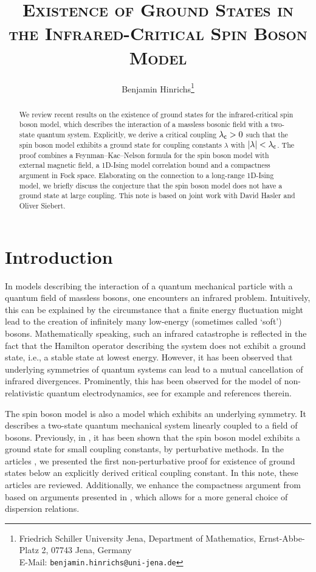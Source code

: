 \documentclass[a4paper,12pt,oneside]{article}
\title{\LARGE\scshape   Existence of Ground States in the Infrared-Critical Spin Boson Model}
\author{Benjamin Hinrichs\thanks{Friedrich Schiller University Jena, Department of Mathematics, Ernst-Abbe-Platz 2, 07743 Jena, Germany\\E-Mail: \texttt{benjamin.hinrichs@uni-jena.de}}}
\begin{document}
	
	\maketitle\thispagestyle{empty}\vspace*{-2em}
	\begin{abstract}\noindent
		We review recent results on the existence of ground states for the infrared-critical spin boson model, which describes the interaction of a massless bosonic field with a two-state quantum system. Explicitly, we derive a critical coupling $\lambda_{\mathsf c}>0$ such that the spin boson model exhibits a ground state for coupling constants $\lambda$ with $|\lambda|<\lambda_{\mathsf c}$. The proof combines a Feynman--Kac--Nelson formula for the spin boson model with external magnetic field, a 1D-Ising model correlation bound and a compactness argument in Fock space. Elaborating on the connection to a long-range 1D-Ising model, we briefly discuss the conjecture that the spin boson model does not have a ground state at large coupling. This note is based on joint work with David Hasler and Oliver Siebert.
	\end{abstract}


\section{Introduction}

In models describing the interaction of a quantum mechanical particle with a quantum field of massless bosons, one encounters an infrared problem. Intuitively, this can be explained by the circumstance that a finite energy fluctuation might lead to the creation of infinitely many low-energy (sometimes called `soft') bosons. Mathematically speaking, such an infrared catastrophe is reflected in the fact that the Hamilton operator describing the system does not exhibit a ground state, i.e., a stable state at lowest energy. However, it has been observed that underlying symmetries of quantum systems can lead to a mutual cancellation of infrared divergences. Prominently, this has been observed for the model of non-relativistic quantum electrodynamics, see for example \cite{GriesemerLiebLoss.2001,BachChenFrohlichSigal.2007,HaslerSiebert.2020} and references therein.

The spin boson model is also a model which exhibits an underlying symmetry. It describes a two-state quantum mechanical system linearly coupled to a field of bosons. Previously, in \cite{HaslerHerbst.2010,BachBallesterosKoenenbergMenrath.2017}, it has been shown that the spin boson model exhibits a ground state for small coupling constants, by perturbative methods. In the articles \cite{HaslerHinrichsSiebert.2021a,HaslerHinrichsSiebert.2021b,HaslerHinrichsSiebert.2021c}, we presented the first non-perturbative proof for existence of ground states below an explicitly derived critical coupling constant. In this note, these articles are reviewed. Additionally, we enhance the compactness argument from \cite{HaslerHinrichsSiebert.2021a} based on arguments presented in \cite{Matte.2016,HiroshimaMatte.2019}, which allows for a more general choice of dispersion relations.
\end{document}
